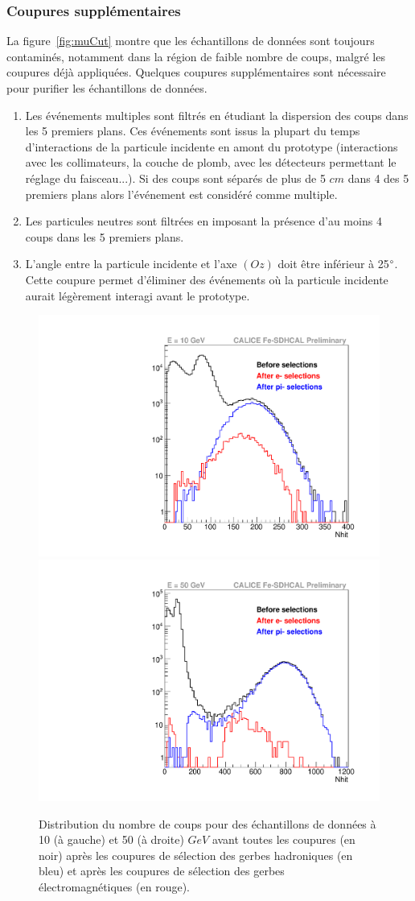 \subsubsection{Coupures supplémentaires}
La figure~\ref{fig:muCut} montre que les échantillons de données sont toujours contaminés, notamment dans la région de faible nombre de coups, malgré les coupures déjà appliquées. Quelques coupures supplémentaires sont nécessaire pour purifier les échantillons de données. 
\begin{enumerate}[-]
\item Les événements multiples sont filtrés en étudiant la dispersion des coups dans les 5 premiers plans. Ces événements sont issus la plupart du temps d’interactions de la particule incidente en amont du prototype (interactions avec les collimateurs, la couche de plomb, avec les détecteurs permettant le réglage du faisceau...). Si des coups sont séparés de plus de 5 $cm$ dans 4 des 5 premiers plans alors l'événement est considéré comme multiple. 
\item Les particules neutres sont filtrées en imposant la présence d'au moins 4 coups dans les 5 premiers plans.
\item L'angle entre la particule incidente et l'axe $(Oz)$ doit être inférieur à 25$\degree$. Cette coupure permet d'éliminer des événements où la particule incidente aurait légèrement interagi avant le prototype.
\end{enumerate}
\label{sec.shower_selection}
\begin{figure}[!h]
  \begin{center}
    \includegraphics[width=.45\textwidth]{SDHCAL/figs/selection715693.pdf}
    \includegraphics[width=.45\textwidth]{SDHCAL/figs/selection715751.pdf}
    \caption{Distribution du nombre de coups pour des échantillons de données à 10 (à gauche) et 50 (à droite) $GeV$ avant toutes les coupures (en noir) après les coupures de sélection des gerbes hadroniques (en bleu) et après les coupures de sélection des gerbes électromagnétiques (en rouge).}
    \label{fig:pion_selection}
  \end{center}
\end{figure}
